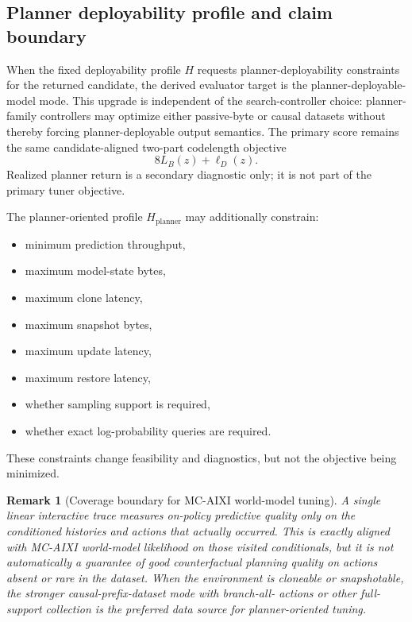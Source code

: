 \documentclass[11pt]{article}
\newtheorem{remark}{Remark}
\begin{document}
\subsection{Planner deployability profile and claim boundary}

When the fixed deployability profile $H$ requests planner-deployability
constraints for the returned candidate, the derived evaluator target is the
planner-deployable-model mode. This upgrade is independent of the
search-controller choice: planner-family controllers may optimize either
passive-byte or causal datasets without thereby forcing planner-deployable
output semantics. The primary score remains the same candidate-aligned two-part
codelength objective
\[
8L_B(z)+\ell_D(z).
\]
Realized planner return is a secondary diagnostic only; it is not part of the
primary tuner objective.

The planner-oriented profile $H_{\mathrm{planner}}$ may additionally constrain:
\begin{itemize}
    \item minimum prediction throughput,
    \item maximum model-state bytes,
    \item maximum clone latency,
    \item maximum snapshot bytes,
    \item maximum update latency,
    \item maximum restore latency,
    \item whether sampling support is required,
    \item whether exact log-probability queries are required.
\end{itemize}
These constraints change feasibility and diagnostics, but not the objective
being minimized.

\begin{remark}[Coverage boundary for MC-AIXI world-model tuning]
A single linear interactive trace measures on-policy predictive quality only on
the conditioned histories and actions that actually occurred. This is exactly
aligned with MC-AIXI world-model likelihood on those visited conditionals, but
it is not automatically a guarantee of good counterfactual planning quality on
actions absent or rare in the dataset. When the environment is cloneable or
snapshotable, the stronger causal-prefix-dataset mode with branch-all-
actions or other full-support collection is the preferred data source for
planner-oriented tuning.
\end{remark}
\end{document}
